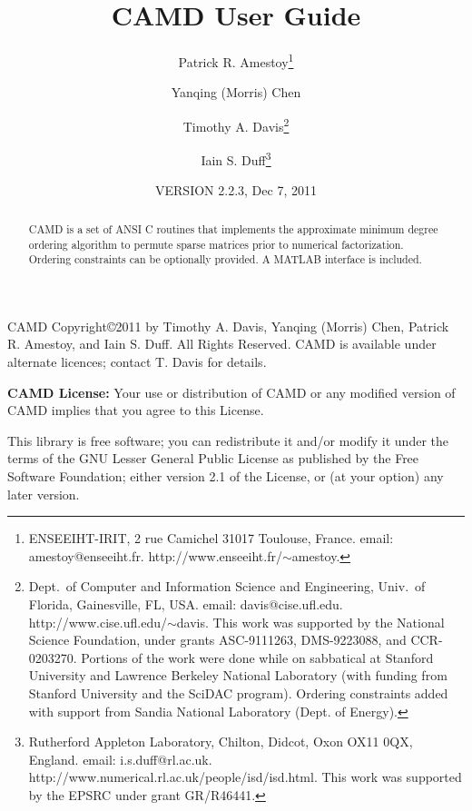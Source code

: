 \documentclass[11pt]{article}
\begin{document}

\title{CAMD User Guide}
\author{Patrick R. Amestoy\thanks{ENSEEIHT-IRIT,
2 rue Camichel 31017 Toulouse, France.
email: amestoy@enseeiht.fr.  http://www.enseeiht.fr/$\sim$amestoy.}
\and Yanqing (Morris) Chen
\and Timothy A. Davis\thanks{
Dept.~of Computer and Information Science and Engineering,
Univ.~of Florida, Gainesville, FL, USA.
email: davis@cise.ufl.edu.
http://www.cise.ufl.edu/$\sim$davis.
This work was supported by the National
Science Foundation, under grants ASC-9111263, DMS-9223088, and CCR-0203270.
Portions of the work were done while on sabbatical at Stanford University
and Lawrence Berkeley National Laboratory (with funding from Stanford
University and the SciDAC program).  Ordering constraints added with
support from Sandia National Laboratory (Dept. of Energy).
}
\and Iain S. Duff\thanks{Rutherford Appleton Laboratory, Chilton, Didcot, 
Oxon OX11 0QX, England. email: i.s.duff@rl.ac.uk.  
http://www.numerical.rl.ac.uk/people/isd/isd.html.
This work was supported by the EPSRC under grant GR/R46441.
}}

\date{VERSION 2.2.3, Dec 7, 2011}
\maketitle

\begin{abstract}
CAMD is a set of ANSI C routines that implements the approximate minimum degree
ordering algorithm to permute sparse matrices prior to
numerical factorization.  Ordering constraints can be optionally provided.
A MATLAB interface is included.
\end{abstract}

CAMD Copyright\copyright 2011 by Timothy A.  Davis,
Yanqing (Morris) Chen,
Patrick R. Amestoy, and Iain S. Duff.  All Rights Reserved.
CAMD is available under alternate licences; contact T. Davis for details.

{\bf CAMD License:}
    Your use or distribution of CAMD or any modified version of
    CAMD implies that you agree to this License.

    This library is free software; you can redistribute it and/or
    modify it under the terms of the GNU Lesser General Public
    License as published by the Free Software Foundation; either
    version 2.1 of the License, or (at your option) any later version.
\end{document}
